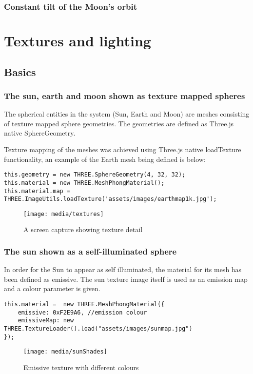 \documentclass[titlepage]{article}
\begin{document}
\subsubsection{Constant tilt of the Moon’s orbit}


\section{Textures and lighting}

\subsection{Basics}
\subsubsection{The sun, earth and moon shown as texture mapped spheres}

The spherical entities in the system (Sun, Earth and Moon) are meshes consisting of texture mapped sphere geometries. The geometries are defined as Three.js native SphereGeometry.

Texture mapping of the meshes was achieved using Three.js native loadTexture functionality, an example of the Earth mesh being defined is below:
\begin{lstlisting}
this.geometry = new THREE.SphereGeometry(4, 32, 32);
this.material = new THREE.MeshPhongMaterial();
this.material.map = THREE.ImageUtils.loadTexture('assets/images/earthmap1k.jpg');
\end{lstlisting}

\begin{figure}[h!]
                \centering
                \texttt{[image: media/textures]}
                \caption{A screen capture showing texture detail}
                \label{fig:basic_model}
\end{figure}


\subsubsection{The sun shown as a self-illuminated sphere}
In order for the Sun to appear as self illuminated, the material for its mesh has been defined as emissive. The sun texture image itself is used as an emission map and a colour parameter is given. 
\begin{lstlisting}
this.material =  new THREE.MeshPhongMaterial({
    emissive: 0xF2E9A6, //emission colour
    emissiveMap: new THREE.TextureLoader().load("assets/images/sunmap.jpg")
});
\end{lstlisting}
\begin{figure}[h!]
                \centering
                \texttt{[image: media/sunShades]}
                \caption{Emissive texture with different colours}
                \label{fig:basic_model}
\end{figure}
\end{document}
